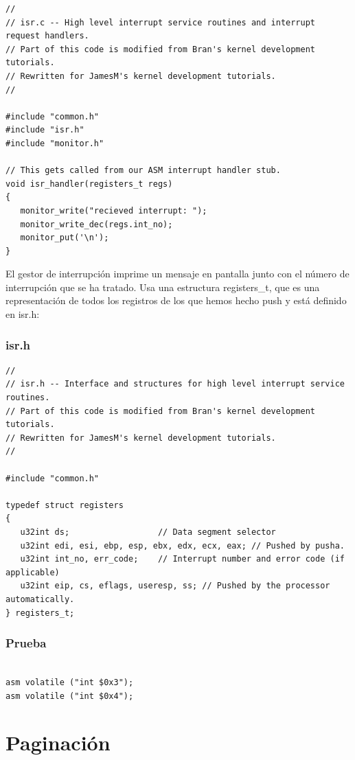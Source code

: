 \documentclass{report}
\begin{document}
\begin{lstlisting}
//
// isr.c -- High level interrupt service routines and interrupt request handlers.
// Part of this code is modified from Bran's kernel development tutorials.
// Rewritten for JamesM's kernel development tutorials.
//

#include "common.h"
#include "isr.h"
#include "monitor.h"

// This gets called from our ASM interrupt handler stub.
void isr_handler(registers_t regs)
{
   monitor_write("recieved interrupt: ");
   monitor_write_dec(regs.int_no);
   monitor_put('\n');
}

\end{lstlisting}

El gestor de interrupción imprime un mensaje en pantalla junto con el número de interrupción que se ha tratado. Usa una estructura registers\_t, que es una representación de todos los registros de los que hemos hecho push y está definido en isr.h:

\subsection{isr.h}


\begin{lstlisting}
//
// isr.h -- Interface and structures for high level interrupt service routines.
// Part of this code is modified from Bran's kernel development tutorials.
// Rewritten for JamesM's kernel development tutorials.
//

#include "common.h"

typedef struct registers
{
   u32int ds;                  // Data segment selector
   u32int edi, esi, ebp, esp, ebx, edx, ecx, eax; // Pushed by pusha.
   u32int int_no, err_code;    // Interrupt number and error code (if applicable)
   u32int eip, cs, eflags, useresp, ss; // Pushed by the processor automatically.
} registers_t;
\end{lstlisting}

\subsection{Prueba}


\begin{lstlisting}

asm volatile ("int $0x3");
asm volatile ("int $0x4");

\end{lstlisting}

\chapter{Paginación}
\end{document}
